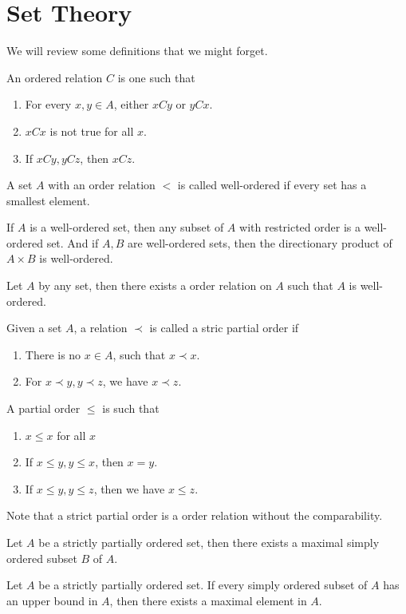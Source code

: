 \chapter{Set Theory}

We will review some definitions that we might forget.

\begin{defn}
    An ordered relation $C$ is one such that 
    \begin{enumerate}
        \item For every $x,y\in A$, either $xCy$ or $yCx$.
        \item $xCx$ is not true for all $x$.
        \item If $xCy, yCz$, then $xCz$. 
    \end{enumerate}
\end{defn}

\begin{defn}
    A set $A$ with an order relation $<$ is called well-ordered if every set has a smallest element.
\end{defn}
If $A$ is a well-ordered set, then any subset of $A$ with restricted order is a well-ordered set. And if $A,B$ are well-ordered sets, then the directionary product of $A\times B$ is well-ordered.

\begin{thm}
    Let $A$ by any set, then there exists a order relation on $A$ such that $A$ is well-ordered.
\end{thm}

\begin{defn}
    Given a set $A$, a relation $\prec$ is called a stric partial order if 
    \begin{enumerate}
        \item There is no $x\in A$, such that $x\prec x$.
        \item For $x\prec y, y\prec z$, we have $x\prec z$.
    \end{enumerate}
    A partial order $\leq$ is such that 
    \begin{enumerate}
        \item $x\leq x$ for all $x$
        \item If $x\leq y, y\leq x$, then $x=y$.
        \item If $x\leq y, y\leq z$, then we have $x\leq z$.
    \end{enumerate}
\end{defn}
Note that a strict partial order is a order relation without the comparability.
\begin{prop}
    Let $A$ be a strictly partially ordered set, then there exists a maximal simply ordered subset $B$ of $A$.
\end{prop}
\begin{lem}
    Let $A$ be a strictly partially ordered set. If every simply ordered subset of $A$ has an upper bound in $A$, then there exists a maximal element in $A$.
\end{lem}



